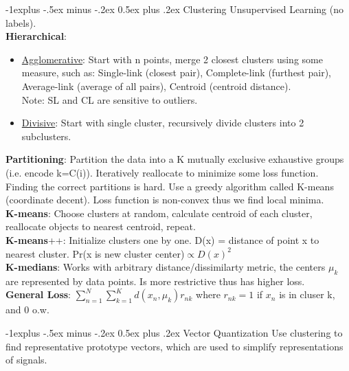 \documentclass[3pt,landscape]{article}
\makeatletter
\renewcommand{\subsection}{\@startsection{subsection}{2}{0mm}%
                            {-1explus -.5ex minus -.2ex}%
                            {0.5ex plus .2ex}%
                            {\normalfont\normalsize\bfseries}}
\makeatother
\begin{document}
\begin{multicols}{3}
\subsection{Clustering}
Unsupervised Learning (no labels).\\
    {\bf Hierarchical}:
    \begin{itemize}[topsep=0pt, partopsep=0pt]
        \setlength{\itemsep}{1pt}
        \setlength{\parskip}{0pt}
        \setlength{\parsep}{0pt}
        \item \underline{Agglomerative}: Start with n points, merge 2 closest clusters using some measure, such as: Single-link (closest pair), Complete-link (furthest pair), Average-link (average of all pairs), Centroid (centroid distance).\\
        Note: SL and CL are sensitive to outliers.
        \item \underline{Divisive}: Start with single cluster, recursively divide clusters into 2 subclusters.
    \end{itemize}
    {\bf Partitioning}: Partition the data into a K mutually exclusive exhaustive groups (i.e. encode k=C(i)). Iteratively reallocate to minimize some loss function. Finding the correct partitions is hard.
    Use a greedy algorithm called K-means (coordinate decent). Loss function is non-convex thus we find local minima.\\
    {\bf K-means}: Choose clusters at random, calculate centroid of each cluster, reallocate objects to nearest centroid, repeat.\\
    {\bf K-means}++: Initialize clusters one by one. D(x) = distance of point x to nearest cluster. Pr(x is new cluster center)$\propto D(x)^2$\\
    {\bf K-medians}: Works with arbitrary distance/dissimilarty metric, the centers $\mu_k$ are represented by data points. Is more restrictive thus has higher loss.\\
    {\bf General Loss}: $\sum_{n=1}^N\sum_{k=1}^Kd(x_n, \mu_k)r_{nk}$ where $r_{nk}=1$ if $x_n$ is in cluser k, and 0 o.w.


\subsection{Vector Quantization}
Use clustering to find representative prototype vectors, which are used to simplify representations of signals.


\end{multicols}
\end{document}
